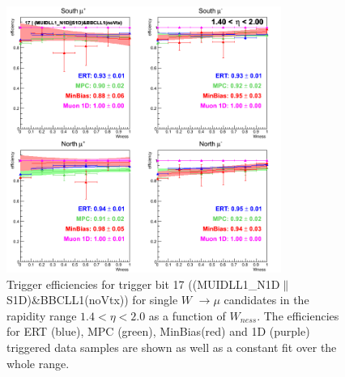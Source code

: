 \begin{figure}[ht]
\begin{center}
\includegraphics[width=0.8\textwidth]{./figures/run13_trigeffisn_eta1_trig17_lin.png}
\caption{\label{fig:run13_trigeffisn_eta1_nper0_trig17_lin} Trigger efficiencies for trigger bit 17 ((MUIDLL1\_N1D$\|$S1D)\&BBCLL1(noVtx)) for single $W$ $\rightarrow \mu$ candidates in the rapidity range $ 1.4 < \eta < 2.0$ as a function of $W_{ness}$. The efficiencies for ERT (blue), MPC (green), MinBias(red) and 1D (purple) triggered data samples are shown as well as a constant fit over the whole range.}
\end{center}
\end{figure}

\clearpage

